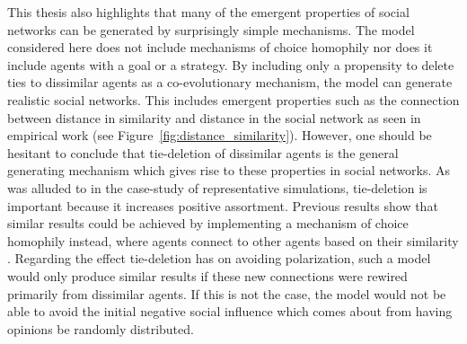 \documentclass[11pt]{article}
\begin{document}
\noindent This thesis also highlights that many of the emergent properties of social networks can be generated by surprisingly simple mechanisms. The model considered here does not include mechanisms of choice homophily nor does it include agents with a goal or a strategy. By including only a propensity to delete ties to dissimilar agents as a co-evolutionary mechanism, the model can generate realistic social networks. This includes emergent properties such as the connection between distance in similarity and distance in the social network as seen in empirical work \cite{kossinets_origins_2009} (see Figure~\ref{fig:distance_similarity}). However, one should be hesitant to conclude that tie-deletion of dissimilar agents is the general generating mechanism which gives rise to these properties in social networks. As was alluded to in the case-study of representative simulations, tie-deletion is important because it increases positive assortment. Previous results show that similar results could be achieved by implementing a mechanism of choice homophily instead, where agents connect to other agents based on their similarity \cite{asikainen_cumulative_2020}. Regarding the effect tie-deletion has on avoiding polarization, such a model would only produce similar results if these new connections were rewired primarily from dissimilar agents. If this is not the case, the model would not be able to avoid the initial negative social influence which comes about from having opinions be randomly distributed. 
\end{document}
